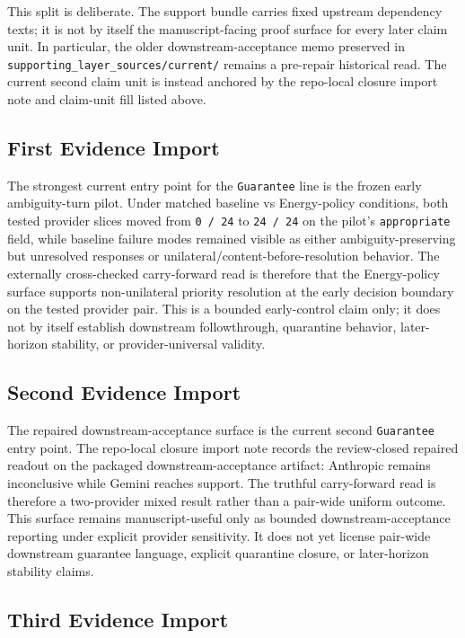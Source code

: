 \documentclass[11pt]{article}
\begin{document}
This split is deliberate. The support bundle carries fixed upstream dependency
texts; it is not by itself the manuscript-facing proof surface for every later
claim unit. In particular, the older downstream-acceptance memo preserved in
\texttt{supporting\_layer\_sources/current/} remains a pre-repair historical
read. The current second claim unit is instead anchored by the repo-local
closure import note and claim-unit fill listed above.

\subsection{First Evidence Import}

The strongest current entry point for the \texttt{Guarantee} line is the frozen
early ambiguity-turn pilot. Under matched baseline vs Energy-policy conditions,
both tested provider slices moved from \texttt{0 / 24} to \texttt{24 / 24} on the
pilot's \texttt{appropriate} field, while baseline failure modes remained visible
as either ambiguity-preserving but unresolved responses or
unilateral/content-before-resolution behavior. The externally cross-checked
carry-forward read is therefore that the Energy-policy surface supports
non-unilateral priority resolution at the early decision boundary on the tested
provider pair. This is a bounded early-control claim only; it does not by itself
establish downstream followthrough, quarantine behavior, later-horizon stability,
or provider-universal validity.

\subsection{Second Evidence Import}

The repaired downstream-acceptance surface is the current second
\texttt{Guarantee} entry point. The repo-local closure import note records the
review-closed repaired readout on the packaged downstream-acceptance artifact:
Anthropic remains inconclusive while Gemini reaches support. The truthful
carry-forward read is therefore a two-provider mixed result rather than a
pair-wide uniform outcome. This surface remains manuscript-useful only as
bounded downstream-acceptance reporting under explicit provider sensitivity. It
does not yet license pair-wide downstream guarantee language, explicit
quarantine closure, or later-horizon stability claims.

\subsection{Third Evidence Import}
\end{document}

